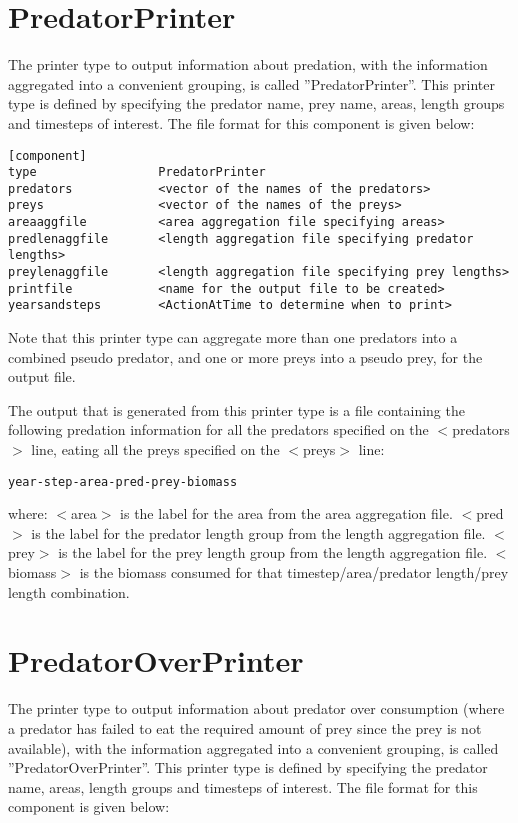 \documentclass [a4paper, 10pt]{book}
\begin{document}
\section{PredatorPrinter}\label{sec:predatorprinter}
The printer type to output information about predation, with the information aggregated into a convenient grouping, is called ''PredatorPrinter''.  This printer type is defined by specifying the predator name, prey name, areas, length groups and timesteps of interest.  The file format for this component is given below:

\begin{verbatim}
[component]
type                 PredatorPrinter
predators            <vector of the names of the predators>
preys                <vector of the names of the preys>
areaaggfile          <area aggregation file specifying areas>
predlenaggfile       <length aggregation file specifying predator lengths>
preylenaggfile       <length aggregation file specifying prey lengths>
printfile            <name for the output file to be created>
yearsandsteps        <ActionAtTime to determine when to print>
\end{verbatim}

Note that this printer type can aggregate more than one predators into a combined pseudo predator, and one or more preys into a pseudo prey, for the output file.

\bigskip
The output that is generated from this printer type is a file containing the following predation information for all the predators specified on the $<$predators$>$ line, eating all the preys specified on the $<$preys$>$ line:

\begin{verbatim}
year-step-area-pred-prey-biomass
\end{verbatim}

where:\newline
$<$area$>$ is the label for the area from the area aggregation file.\newline
$<$pred$>$ is the label for the predator length group from the length aggregation file.\newline
$<$prey$>$ is the label for the prey length group from the length aggregation file.\newline
$<$biomass$>$ is the biomass consumed for that timestep/area/predator length/prey length combination.

\section{PredatorOverPrinter}\label{sec:predatoroverprinter}
The printer type to output information about predator over consumption (where a predator has failed to eat the required amount of prey since the prey is not available), with the information aggregated into a convenient grouping, is called ''PredatorOverPrinter''.  This printer type is defined by specifying the predator name, areas, length groups and timesteps of interest.  The file format for this component is given below:
\end{document}
